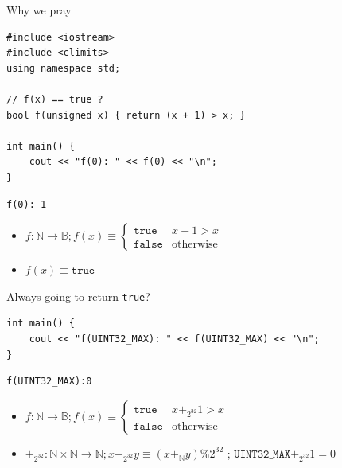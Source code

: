 \documentclass[8pt]{beamer}
\newcommand{\N}{\mathbb N}
\newcommand{\B}{\mathbb B}
\newcommand{\cpp}[1]{\texttt{#1}}
\begin{document}
\begin{frame}[fragile]{Why we pray}
\pause

{\small
\begin{verbatim}
#include <iostream>
#include <climits>
using namespace std;

// f(x) == true ?
bool f(unsigned x) { return (x + 1) > x; }

int main() {
    cout << "f(0): " << f(0) << "\n";
}
\end{verbatim}
\pause
\begin{verbatim}
f(0): 1
\end{verbatim}
\pause
\begin{itemize}
    \item 
        $f: \N \rightarrow \B; f(x) \equiv \begin{cases} \texttt{true} & x + 1 > x \\ \texttt{false} & \text{otherwise} \end{cases}$
        \pause
    \item $f(x) \equiv \texttt{true}$ \pause
\end{itemize}
Always going to return \cpp{true}?
\pause
\begin{verbatim}
int main() {
    cout << "f(UINT32_MAX): " << f(UINT32_MAX) << "\n";
}
\end{verbatim}
}

\pause
\begin{verbatim}
f(UINT32_MAX):0
\end{verbatim}

\pause
\begin{itemize}
    \item $f: \N \rightarrow \B; f(x) \equiv \begin{cases} \texttt{true} & x +_{2^{32}} 1 > x \\ \texttt{false} & \text{otherwise} \end{cases}$ \pause
    \item $+_{2^32}: \N \times \N \rightarrow \N; x +_{2^{32}} y \equiv (x +_\N y) \% 2^{32}$ \pause; $\texttt{UINT32\_MAX} +_{2^{32}} 1 = 0 $
\end{itemize}
\end{frame}
\end{document}
